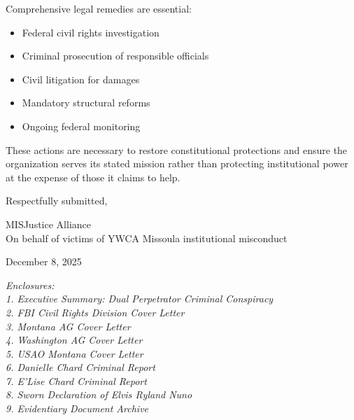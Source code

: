 \documentclass[12pt,oneside]{article}
\begin{document}
Comprehensive legal remedies are essential:
\begin{itemize}
\item Federal civil rights investigation
\item Criminal prosecution of responsible officials
\item Civil litigation for damages
\item Mandatory structural reforms
\item Ongoing federal monitoring
\end{itemize}

These actions are necessary to restore constitutional protections and ensure the organization serves its stated mission rather than protecting institutional power at the expense of those it claims to help.

\vspace{0.3in}

\noindent
Respectfully submitted,

\vspace{0.3in}

\noindent
MISJustice Alliance \\
On behalf of victims of YWCA Missoula institutional misconduct

\vspace{0.2in}

\noindent
December 8, 2025

\vspace{0.3in}

\noindent
\textit{Enclosures:} \\
\textit{1. Executive Summary: Dual Perpetrator Criminal Conspiracy} \\
\textit{2. FBI Civil Rights Division Cover Letter} \\
\textit{3. Montana AG Cover Letter} \\
\textit{4. Washington AG Cover Letter} \\
\textit{5. USAO Montana Cover Letter} \\
\textit{6. Danielle Chard Criminal Report} \\
\textit{7. E'Lise Chard Criminal Report} \\
\textit{8. Sworn Declaration of Elvis Ryland Nuno} \\
\textit{9. Evidentiary Document Archive}
\end{document}
